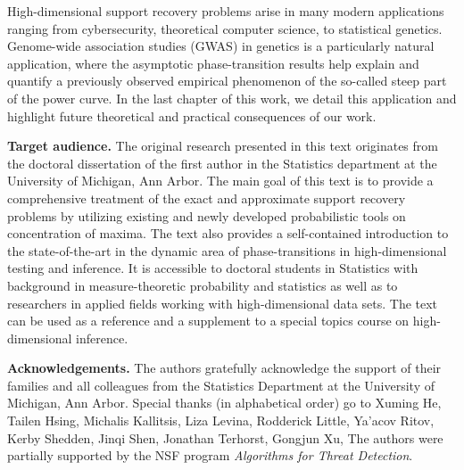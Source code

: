 High-dimensional support recovery problems arise in many modern applications ranging from cybersecurity, theoretical computer science,
to statistical genetics.  Genome-wide association studies (GWAS) in genetics is a particularly natural application, where the asymptotic 
phase-transition results help explain and quantify a previously observed empirical phenomenon of the so-called steep part of the power 
curve.  In the last chapter of this work, we detail this application and highlight future theoretical and practical consequences of our work.


{\bf Target audience.} The original research presented in this text originates from the doctoral dissertation of the first author in the 
Statistics department at the University of Michigan, Ann Arbor.  The main goal of this text is to provide a comprehensive treatment of the
exact and approximate support recovery problems by utilizing existing and newly developed probabilistic tools on concentration of maxima.
The text also provides a self-contained introduction to the state-of-the-art in the dynamic area of phase-transitions in high-dimensional 
testing and inference.  It is accessible to doctoral students in Statistics with background in measure-theoretic probability and  
statistics as well as to researchers in applied fields working with high-dimensional data sets.  The text can be used as a reference and a
supplement to a special topics course on high-dimensional inference.

{\bf Acknowledgements.} The authors gratefully acknowledge the support of their families and all colleagues from the Statistics Department 
at the University of Michigan, Ann Arbor.   Special thanks (in alphabetical order) go to Xuming He, Tailen Hsing, Michalis Kallitsis, Liza Levina, 
Rodderick Little, Ya'acov Ritov, Kerby Shedden, Jinqi Shen, Jonathan Terhorst, Gongjun Xu, 
The authors were partially supported by the NSF program {\em Algorithms for Threat Detection}.


